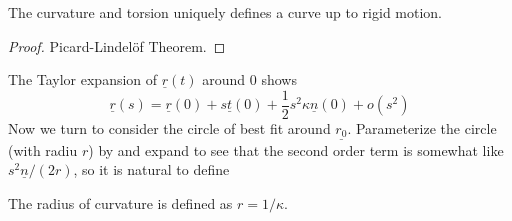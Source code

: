 \begin{proposition}
    The curvature and torsion uniquely defines a curve up to rigid motion.
\end{proposition}
\begin{proof}
    Picard-Lindel\"of Theorem.
\end{proof}
The Taylor expansion of $\underline{r}(t)$ around $0$ shows
$$\underline{r}(s)=\underline{r}(0)+s\underline{t}(0)+\frac{1}{2}s^2\kappa\underline{n}(0)+o(s^2)$$
Now we turn to consider the circle of best fit around $\underline{r_0}$.
Parameterize the circle (with radiu $r$) by and expand to see that the second order term is somewhat like $s^2\underline{n}/(2r)$, so it is natural to define
\begin{definition}
    The radius of curvature is defined as $r=1/\kappa$.
\end{definition}